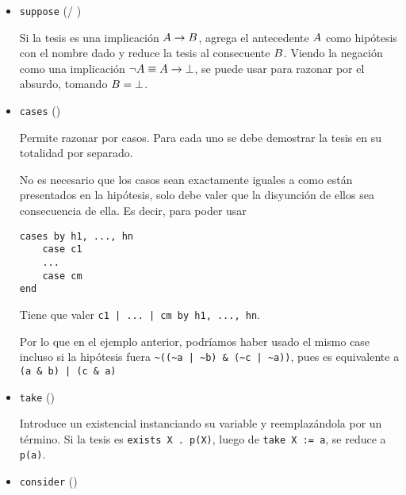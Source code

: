 \begin{itemize}
    \item \lstinline{suppose} ( / )
    
    Si la tesis es una implicación $A \to B$, agrega el antecedente
    $A$ como hipótesis con el nombre dado y reduce la tesis al consecuente
    $B$. Viendo la negación como una implicación $\neg A \equiv
    A \to \bot$, se puede usar para razonar por el absurdo, tomando
    $B = \bot$.

    \begin{multicols}{2}
        
        \vfill\null
        \columnbreak
            
    \end{multicols}
    \item \lstinline{cases} ()
    
    Permite razonar por casos. Para cada uno se debe demostrar la tesis en su
    totalidad por separado.

    

    No es necesario que los casos sean exactamente iguales a como están
    presentados en la hipótesis, solo debe valer que la disyunción de ellos sea
    consecuencia de ella. Es decir, para poder usar

    \begin{lstlisting}[numbers=none]
cases by h1, ..., hn
    case c1
    ...
    case cm
end
    \end{lstlisting}

    Tiene que valer \lstinline{c1 | ... | cm by h1, ..., hn}.
    
    Por lo que en el ejemplo anterior, podríamos haber usado el mismo case
    incluso si la hipótesis fuera \lstinline{~((~a | ~b) & (~c | ~a))}, pues es
    equivalente a \lstinline{(a & b) | (c & a)}

    \item \lstinline{take} ()
    
    Introduce un existencial instanciando su variable y reemplazándola por un
    término. Si la tesis es \lstinline{exists X . p(X)}, luego de
    \lstinline{take X := a}, se reduce a \lstinline{p(a)}.

    \item \lstinline{consider} ()
    

\end{itemize}
